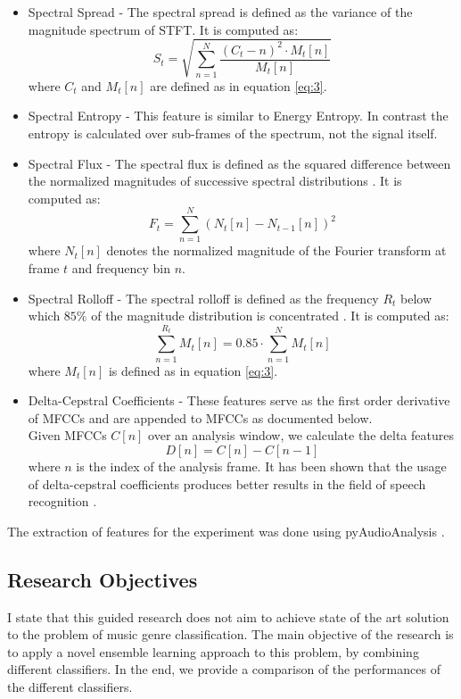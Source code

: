 \documentclass[a4paper,11pt,oneside]{article}
\begin{document}
\begin{itemize}
  \item Spectral Spread - The spectral spread is defined as the variance of the magnitude spectrum of STFT.
  It is computed as:
  \begin{equation}
    S_t = \sqrt{\sum_{n=1}^N \frac{(C_t-n)^2\cdot M_t[n]}{M_t[n]}}
  \end{equation} where $C_t$ and $M_t[n]$ are defined as in equation \ref{eq:3}.
  \item Spectral Entropy - This feature is similar to Energy Entropy. In contrast the entropy is
  calculated over sub-frames of the spectrum, not the signal itself.
  \item Spectral Flux - The spectral flux is defined as the squared difference between the normalized magnitudes
  of successive spectral distributions \cite{tzan}. It is computed as:
  \begin{equation}
    F_t = \sum_{n=1}^N (N_t[n]-N_{t-1}[n])^2
  \end{equation} where $N_t[n]$ denotes the normalized magnitude of the Fourier 
  transform at frame $t$ and frequency bin $n$.
  \item Spectral Rolloff - The spectral rolloff is defined as the frequency $R_t$ below which $85\%$ of the magnitude
  distribution is concentrated \cite{tzan}. It is computed as:
  \begin{equation}
    \sum_{n=1}^{R_t} M_t[n] = 0.85 \cdot \sum_{n=1}^N M_t[n]
  \end{equation} where $M_t[n]$ is defined as in equation \ref{eq:3}.
  \item Delta-Cepstral Coefficients - These features serve as the first order derivative of MFCCs and
   are appended to MFCCs as documented below.\\
  Given MFCCs $C[n]$ over an analysis window, we calculate the delta features
  \begin{equation}
    D[n] = C[n]-C[n-1]
  \end{equation} where $n$ is the index of the analysis frame. It has been shown that the usage of delta-cepstral
  coefficients produces better results in the field of speech recognition \cite{kumar2011delta}.
\end{itemize}
The extraction of features for the experiment was done using pyAudioAnalysis \cite{giannakopoulos2015pyaudioanalysis}.
\subsection{Research Objectives}
I state that this guided research does not aim to achieve state of the art solution to the problem of music genre 
classification. The main objective of the research is to apply a novel ensemble learning approach to this problem, by combining different classifiers. In the end, we provide a comparison of the performances of the different classifiers. 
\end{document}
